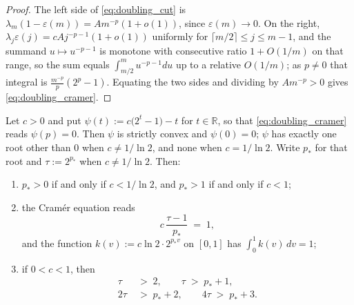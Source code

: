 \begin{proof}
The left side of \eqref{eq:doubling_cut} is $\lambda_m(1-\varepsilon(m))=Am^{-p}(1+o(1))$,
since $\varepsilon(m)\rightarrow0$. On the right,
$\lambda_j\varepsilon(j)=cAj^{-p-1}(1+o(1))$ uniformly for $\lceil m/2\rceil\leq j\leq m-1$,
and the summand $u\mapsto u^{-p-1}$ is monotone with consecutive ratio $1+O(1/m)$ on that
range, so the sum equals $\int_{m/2}^{m}u^{-p-1}du$ up to a relative $O(1/m)$; as $p\neq0$
that integral is $\frac{m^{-p}}{p}\left(2^p-1\right)$. Equating the two sides and dividing by
$Am^{-p}>0$ gives \eqref{eq:doubling_cramer}.
\end{proof}

\begin{lemma}\label{lem:doubling_cramer_root}
Let $c>0$ and put $\psi(t):=c\bigl(2^{t}-1\bigr)-t$ for $t\in\mathbb R$, so that
\eqref{eq:doubling_cramer} reads $\psi(p)=0$. Then $\psi$ is strictly convex and $\psi(0)=0$;
$\psi$ has exactly one root other than $0$ when $c\neq1/\ln2$, and none when $c=1/\ln2$.
Write $p_*$ for that root and $\tau:=2^{p_*}$ when $c\neq1/\ln2$. Then:
\begin{enumerate}
    \item $p_*>0$ if and only if $c<1/\ln2$, and $p_*>1$ if and only if $c<1$;
    \item the Cram\'er equation reads
    \begin{equation}\label{eq:doubling_cramer_form}
        c\,\frac{\tau-1}{p_*}\;=\;1 ,
    \end{equation}
    and the function $k(v):=c\ln2\cdot2^{p_*v}$ on $[0,1]$ has $\int_0^1k(v)\,dv=1$;
    \item if $0<c<1$, then
    \begin{equation}\label{eq:doubling_cramer_ineq}
    \begin{aligned}
        \tau\;&>\;2,\qquad \tau\;>\;p_*+1,\\
        2\tau\;&>\;p_*+2,\qquad 4\tau\;>\;p_*+3 .
    \end{aligned}
    \end{equation}
\end{enumerate}
\end{lemma}

